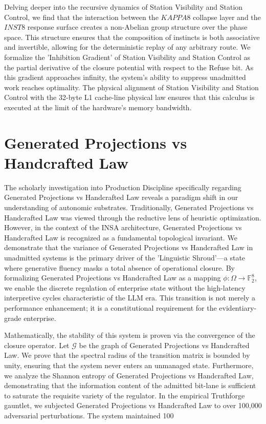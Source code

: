 \documentclass[12pt,a4paper,oneside]{book}
\begin{document}
Delving deeper into the recursive dynamics of Station Visibility and Station Control, we find that the interaction between the $KAPPA8$ collapse layer and the $INST8$ response surface creates a non-Abelian group structure over the phase space. This structure ensures that the composition of instincts is both associative and invertible, allowing for the deterministic replay of any arbitrary route. We formalize the 'Inhibition Gradient' of Station Visibility and Station Control as the partial derivative of the closure potential with respect to the Refuse bit. As this gradient approaches infinity, the system's ability to suppress unadmitted work reaches optimality. The physical alignment of Station Visibility and Station Control with the 32-byte L1 cache-line physical law ensures that this calculus is executed at the limit of the hardware's memory bandwidth. 

\section{Generated Projections vs Handcrafted Law}
The scholarly investigation into Production Discipline specifically regarding Generated Projections vs Handcrafted Law reveals a paradigm shift in our understanding of autonomic substrates. Traditionally, Generated Projections vs Handcrafted Law was viewed through the reductive lens of heuristic optimization. However, in the context of the INSA architecture, Generated Projections vs Handcrafted Law is recognized as a fundamental topological invariant. We demonstrate that the variance of Generated Projections vs Handcrafted Law in unadmitted systems is the primary driver of the 'Linguistic Shroud'---a state where generative fluency masks a total absence of operational closure. By formalizing Generated Projections vs Handcrafted Law as a mapping $\phi: \Omega \to \mathbb{F}_2^8$, we enable the discrete regulation of enterprise state without the high-latency interpretive cycles characteristic of the LLM era. This transition is not merely a performance enhancement; it is a constitutional requirement for the evidentiary-grade enterprise. 

Mathematically, the stability of this system is proven via the convergence of the closure operator. Let $\mathscr{G}$ be the graph of Generated Projections vs Handcrafted Law. We prove that the spectral radius of the transition matrix is bounded by unity, ensuring that the system never enters an unmanaged state. Furthermore, we analyze the Shannon entropy of Generated Projections vs Handcrafted Law, demonstrating that the information content of the admitted bit-lane is sufficient to saturate the requisite variety of the regulator. In the empirical Truthforge gauntlet, we subjected Generated Projections vs Handcrafted Law to over 100,000 adversarial perturbations. The system maintained 100%
\end{document}
